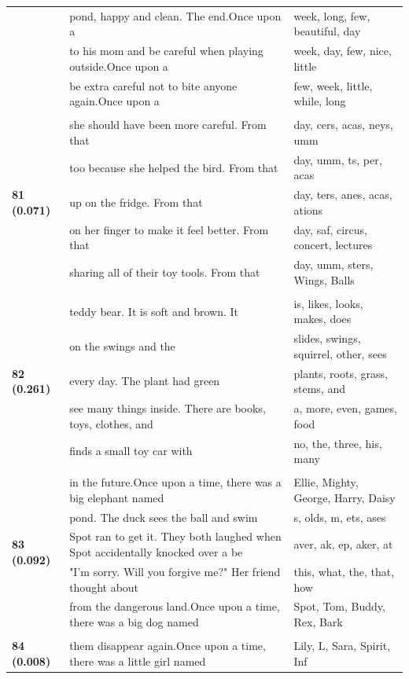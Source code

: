 \documentclass{article}
\theoremstyle{plain}
\theoremstyle{definition}
\theoremstyle{remark}
\begin{document}
\begin{longtable}{|p{}|p{}|p{}|}
& pond, happy and clean. The end.Once upon a & week,  long,  few,  beautiful,  day \\
& to his mom and be careful when playing outside.Once upon a & week,  day,  few,  nice,  little \\
& be extra careful not to bite anyone again.Once upon a & few,  week,  little,  while,  long \\
& & \\
\multirow{5}{*}{\textbf{81 (0.071)}} & she should have been more careful. From that & day, cers, acas, neys, umm \\
& too because she helped the bird. From that & day, umm, ts, per, acas \\
& up on the fridge. From that & day, ters, anes, acas, ations \\
& on her finger to make it feel better. From that & day,  saf,  circus,  concert,  lectures \\
& sharing all of their toy tools. From that & day, umm, sters,  Wings,  Balls \\
& & \\
\multirow{5}{*}{\textbf{82 (0.261)}} & teddy bear. It is soft and brown. It & is,  likes,  looks,  makes,  does \\
& on the swings and the & slides,  swings,  squirrel,  other,  sees \\
& every day. The plant had green & plants,  roots,  grass,  stems,  and \\
& see many things inside. There are books, toys, clothes, and & a,  more,  even,  games,  food \\
& finds a small toy car with & no,  the,  three,  his,  many \\
& & \\
\multirow{5}{*}{\textbf{83 (0.092)}} & in the future.Once upon a time, there was a big elephant named & Ellie,  Mighty,  George,  Harry,  Daisy \\
& pond. The duck sees the ball and swim & s, olds, m, ets, ases \\
& Spot ran to get it. They both laughed when Spot accidentally knocked over a be & aver, ak, ep, aker, at \\
& "I'm sorry. Will you forgive me?" Her friend thought about & this,  what,  the,  that,  how \\
& from the dangerous land.Once upon a time, there was a big dog named & Spot,  Tom,  Buddy,  Rex,  Bark \\
& & \\
\multirow{5}{*}{\textbf{84 (0.008)}} & them disappear again.Once upon a time, there was a little girl named & Lily,  L,  Sara,  Spirit,  Inf \\

\end{longtable}
\end{document}
